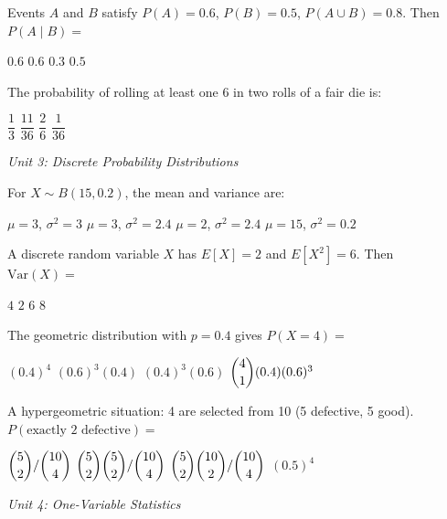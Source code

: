 \documentclass[addpoints]{exam}
\begin{document}
\begin{questions}
\question[1] Events $A$ and $B$ satisfy $P(A) = 0.6$, $P(B) = 0.5$, $P(A \cup B) = 0.8$.
Then $P(A \mid B) =$
\begin{choices}
    \choice $0.6$
    \correctchoice $0.6$
    \choice $0.3$
    \choice $0.5$
\end{choices}

\question[1] The probability of rolling at least one 6 in two rolls of a fair die is:
\begin{choices}
    \choice $\dfrac{1}{3}$
    \correctchoice $\dfrac{11}{36}$
    \choice $\dfrac{2}{6}$
    \choice $\dfrac{1}{36}$
\end{choices}

\vspace{3mm}
\noindent\textit{Unit 3: Discrete Probability Distributions}
\vspace{3mm}

\question[1] For $X \sim B(15, 0.2)$, the mean and variance are:
\begin{choices}
    \choice $\mu = 3$, $\sigma^2 = 3$
    \correctchoice $\mu = 3$, $\sigma^2 = 2.4$
    \choice $\mu = 2$, $\sigma^2 = 2.4$
    \choice $\mu = 15$, $\sigma^2 = 0.2$
\end{choices}

\question[1] A discrete random variable $X$ has $E[X] = 2$ and $E[X^2] = 6$.
Then $\text{Var}(X) =$
\begin{choices}
    \choice $4$
    \correctchoice $2$
    \choice $6$
    \choice $8$
\end{choices}

\question[1] The geometric distribution with $p = 0.4$ gives $P(X = 4) =$
\begin{choices}
    \choice $(0.4)^4$
    \correctchoice $(0.6)^3(0.4)$
    \choice $(0.4)^3(0.6)$
    \choice $\dbinom{4}{1}(0.4)(0.6)^3$
\end{choices}

\question[1] A hypergeometric situation: 4 are selected from 10 (5 defective, 5 good).
$P(\text{exactly 2 defective}) =$
\begin{choices}
    \choice $\dbinom{5}{2}/\dbinom{10}{4}$
    \correctchoice $\dbinom{5}{2}\dbinom{5}{2}/\dbinom{10}{4}$
    \choice $\dbinom{5}{2}\dbinom{10}{2}/\dbinom{10}{4}$
    \choice $(0.5)^4$
\end{choices}

\vspace{3mm}
\noindent\textit{Unit 4: One-Variable Statistics}
\vspace{3mm}


\end{questions}
\end{document}
